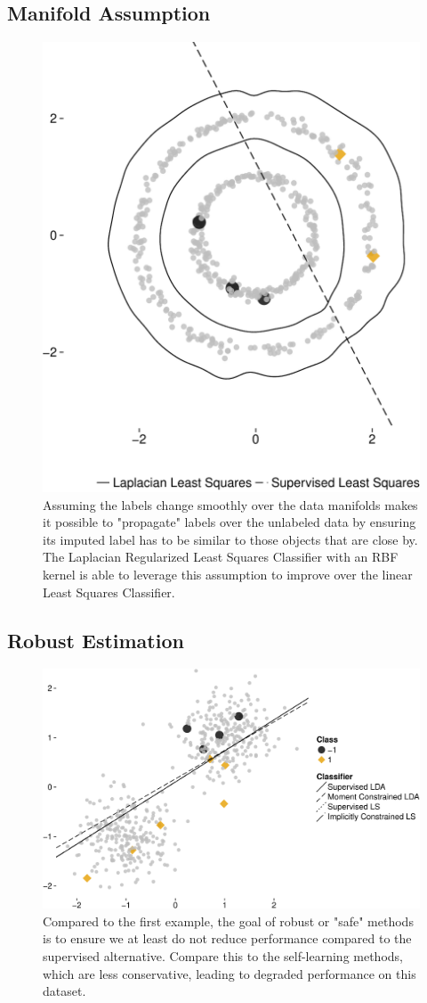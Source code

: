 \documentclass[final]{beamer}
\begin{document}
\begin{frame}[t]
\begin{multicols}{3}
\subsection{Manifold Assumption}
\begin{figure}
\centering
\includegraphics[width=0.70\columnwidth]{Figure3.pdf}
\caption{Assuming the labels change smoothly over the data manifolds makes it possible to "propagate" labels over the unlabeled data by ensuring its imputed label has to be similar to those objects that are close by. The Laplacian Regularized Least Squares Classifier with an RBF kernel is able to leverage this assumption to improve over the linear Least Squares Classifier.}
\end{figure}


\subsection{Robust Estimation}
\begin{figure}
\centering
\includegraphics[width=0.99\columnwidth]{Figure4.pdf}
\caption{Compared to the first example, the goal of robust or "safe" methods is to ensure we at least do not reduce performance compared to the supervised alternative. Compare this to the self-learning methods, which are less conservative, leading to degraded performance on this dataset.}
\end{figure}



\end{multicols}
\end{frame}
\end{document}
